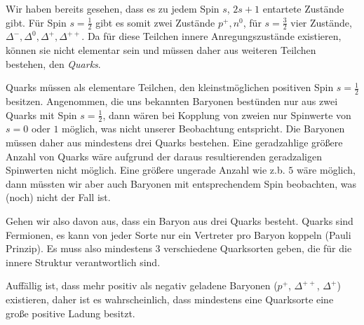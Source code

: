Wir haben bereits gesehen, dass es zu jedem Spin $s$, $2s+1$ entartete Zustände
gibt. Für Spin $s=\frac{1}{2}$ gibt es somit zwei Zustände $p^+,n^0$, für
$s=\frac{3}{2}$ vier Zustände, $\Delta^-, \Delta^0, \Delta^+, \Delta^{++}$. Da
für diese Teilchen innere Anregungszustände existieren, können sie nicht
elementar sein und müssen daher aus weiteren Teilchen bestehen,
den \emph{Quarks}.


Quarks müssen als elementare Teilchen, den kleinstmöglichen positiven Spin
$s=\frac{1}{2}$ besitzen.
Angenommen, die uns bekannten Baryonen bestünden nur aus zwei Quarks mit Spin
$s=\frac{1}{2}$, dann wären bei Kopplung von zweien nur Spinwerte von $s=0$
oder $1$ möglich, was nicht unserer Beobachtung entspricht. Die Baryonen müssen
daher aus mindestens drei Quarks bestehen.
Eine geradzahlige größere Anzahl von Quarks wäre
aufgrund der daraus resultierenden geradzaligen Spinwerten nicht möglich.
Eine
größere ungerade Anzahl wie z.b. $5$ wäre möglich, dann müssten
wir aber auch Baryonen mit entsprechendem Spin beobachten, was (noch) nicht der
Fall ist.

Gehen wir also davon aus, dass ein Baryon aus drei Quarks besteht. 
Quarks sind Fermionen, es kann von jeder Sorte nur ein Vertreter
pro Baryon koppeln (Pauli Prinzip). Es muss also mindestens $3$ verschiedene
Quarksorten geben, die für die innere Struktur verantwortlich sind. 

Auffällig ist, dass mehr positiv als negativ geladene Baryonen ($p^+$,
$\Delta^{++}$, $\Delta^+$) existieren, daher ist es wahrscheinlich, dass
mindestens eine Quarksorte eine große positive Ladung besitzt.

